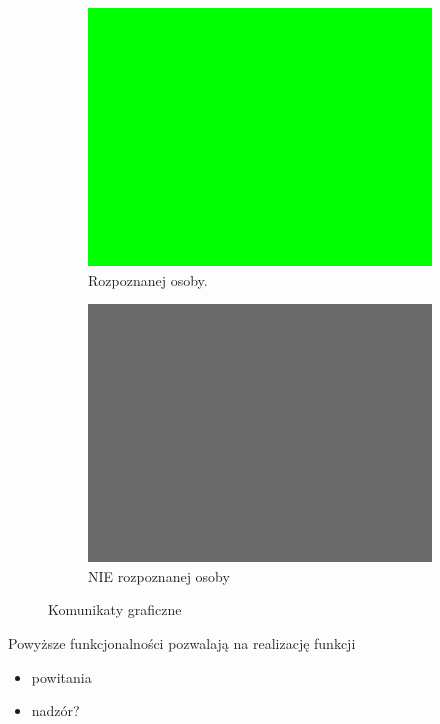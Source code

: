 \documentclass[a4paper,12pt,reqno]{article}
\begin{document}
\begin{figure}[H]%
	\centering
	\begin{subfigure}{.5\textwidth}
		\centering
		\includegraphics[width=0.8\linewidth]{imgs/testy_rozpoznana.png}
		\caption{Rozpoznanej osoby. \cite{img_by_me}}	
		\label{komunikatgraficzny:rozpoznana}
	\end{subfigure}%
	\begin{subfigure}{.5\textwidth}
		\centering
		\includegraphics[width=0.8\linewidth]{imgs/testy_NIErozpoznana.png}
		\caption{NIE rozpoznanej osoby \cite{img_by_me}}
		\label{komunikatgraficzny:NIErozpoznana}
	\end{subfigure}%
\caption{Komunikaty graficzne}
\label{komunikatgraficzny:komunikatgraficzny}
\end{figure}

Powyższe funkcjonalności pozwalają na realizację funkcji

\begin{itemize}
	\item powitania
	\item nadzór\textcolor{to_check_at_end}{?}
\end{itemize}
\end{document}
